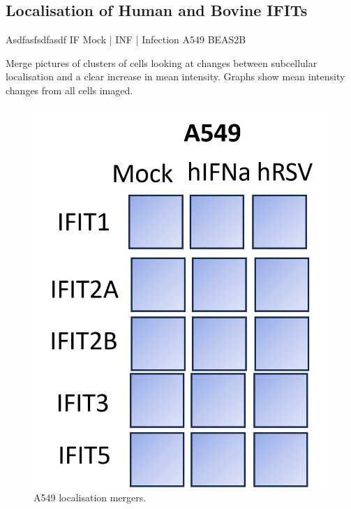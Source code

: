 \subsection{Localisation of Human and Bovine IFITs} \label{Localisation of Human and Bovine IFITs}
Asdfasfsdfasdf \newline
IF Mock | INF | Infection \newline
A549 BEAS2B

Merge pictures of clusters of cells looking at changes between subcellular localisation and a clear increase in mean intensity. Graphs show mean intensity changes from all cells imaged.

\begin{figure}
    \centering
    \includegraphics[width=1\linewidth]{06. Chapter 1/Figs/03. Localisation/01. a549 merges.png}
    \caption[A549 localisation mergers.]{A549 localisation mergers.}
    \label{A549 localisation mergers.}
\end{figure}


